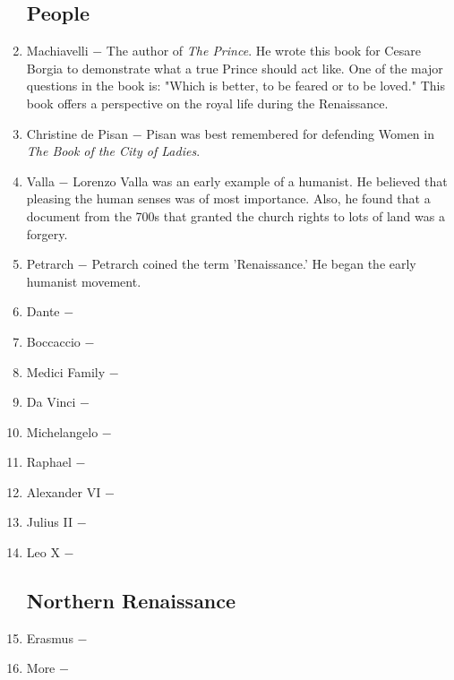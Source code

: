 \documentclass[12pt]{article}
\begin{document}
\begin{enumerate}
\subsection{People}

\item Machiavelli $-$ The author of \textit{The Prince}. He wrote this book for Cesare Borgia to demonstrate what a true Prince should act like. One of the major questions in the book is: "Which is better, to be feared or to be loved." This book offers a perspective on the royal life during the Renaissance.

\item Christine de Pisan $-$ Pisan was best remembered for defending Women in \textit{The Book of the City of Ladies}. 

\item Valla $-$ Lorenzo Valla was an early example of a humanist. He believed that pleasing the human senses was of most importance. Also, he found that a document from the 700s that granted the church rights to lots of land was a forgery.

\item Petrarch $-$ Petrarch coined the term 'Renaissance.' He began the early humanist movement. 

\item Dante $-$

\item Boccaccio $-$ 

\item Medici Family $-$

\item Da Vinci $-$

\item Michelangelo $-$

\item Raphael $-$

\item Alexander VI $-$

\item Julius II $-$

\item Leo X $-$ 

\subsection{Northern Renaissance}

\item Erasmus $-$

\item More $-$


\end{enumerate}
\end{document}
